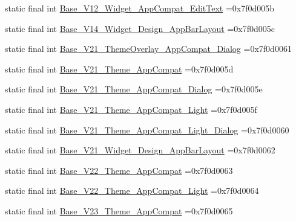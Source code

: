 \begin{DoxyCompactItemize}
\item 
static final int \mbox{\hyperlink{classbr_1_1unb_1_1cic_1_1mp_1_1marketmaster_1_1R_1_1style_a15314b1ae7a5196f6a94e86b61a5a905}{Base\+\_\+\+V12\+\_\+\+Widget\+\_\+\+App\+Compat\+\_\+\+Edit\+Text}} =0x7f0d005b
\item 
static final int \mbox{\hyperlink{classbr_1_1unb_1_1cic_1_1mp_1_1marketmaster_1_1R_1_1style_aff85e14f96231fa78a76ca9a1e8ea751}{Base\+\_\+\+V14\+\_\+\+Widget\+\_\+\+Design\+\_\+\+App\+Bar\+Layout}} =0x7f0d005c
\item 
static final int \mbox{\hyperlink{classbr_1_1unb_1_1cic_1_1mp_1_1marketmaster_1_1R_1_1style_abff5bb55e38a7d08cfcf6edd28e0c2ae}{Base\+\_\+\+V21\+\_\+\+Theme\+Overlay\+\_\+\+App\+Compat\+\_\+\+Dialog}} =0x7f0d0061
\item 
static final int \mbox{\hyperlink{classbr_1_1unb_1_1cic_1_1mp_1_1marketmaster_1_1R_1_1style_a1c8383a9a35eb514fa8ecef8b2c877dc}{Base\+\_\+\+V21\+\_\+\+Theme\+\_\+\+App\+Compat}} =0x7f0d005d
\item 
static final int \mbox{\hyperlink{classbr_1_1unb_1_1cic_1_1mp_1_1marketmaster_1_1R_1_1style_ad257610404abc5adaf2fe3a7755beb7e}{Base\+\_\+\+V21\+\_\+\+Theme\+\_\+\+App\+Compat\+\_\+\+Dialog}} =0x7f0d005e
\item 
static final int \mbox{\hyperlink{classbr_1_1unb_1_1cic_1_1mp_1_1marketmaster_1_1R_1_1style_a450e0efce8d21fde04a6db3d44bf6076}{Base\+\_\+\+V21\+\_\+\+Theme\+\_\+\+App\+Compat\+\_\+\+Light}} =0x7f0d005f
\item 
static final int \mbox{\hyperlink{classbr_1_1unb_1_1cic_1_1mp_1_1marketmaster_1_1R_1_1style_a0d877e286adc1b5dae41a6fbd4fa3795}{Base\+\_\+\+V21\+\_\+\+Theme\+\_\+\+App\+Compat\+\_\+\+Light\+\_\+\+Dialog}} =0x7f0d0060
\item 
static final int \mbox{\hyperlink{classbr_1_1unb_1_1cic_1_1mp_1_1marketmaster_1_1R_1_1style_a0910fdc7e2b652f0d44a89482c9bfda4}{Base\+\_\+\+V21\+\_\+\+Widget\+\_\+\+Design\+\_\+\+App\+Bar\+Layout}} =0x7f0d0062
\item 
static final int \mbox{\hyperlink{classbr_1_1unb_1_1cic_1_1mp_1_1marketmaster_1_1R_1_1style_a83e9f080ee6be1e442981e1103c39534}{Base\+\_\+\+V22\+\_\+\+Theme\+\_\+\+App\+Compat}} =0x7f0d0063
\item 
static final int \mbox{\hyperlink{classbr_1_1unb_1_1cic_1_1mp_1_1marketmaster_1_1R_1_1style_a0620bc3b6ab85178f041da530fea9813}{Base\+\_\+\+V22\+\_\+\+Theme\+\_\+\+App\+Compat\+\_\+\+Light}} =0x7f0d0064
\item 
static final int \mbox{\hyperlink{classbr_1_1unb_1_1cic_1_1mp_1_1marketmaster_1_1R_1_1style_a9a1456559bf797ea3909d1bd23539475}{Base\+\_\+\+V23\+\_\+\+Theme\+\_\+\+App\+Compat}} =0x7f0d0065

\end{DoxyCompactItemize}
